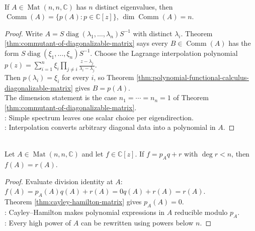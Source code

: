 \begin{corollary} \label{cor:commutant-distinct-eigenvalues-polynomials} \\
If $A\in\operatorname{Mat}(n,n,\mathbb{C})$ has $n$ distinct eigenvalues, then $\operatorname{Comm}(A)=\{p(A):p\in\mathbb{C}[z]\}$, $\dim\operatorname{Comm}(A)=n$.
\begin{proof}
Write $A=S\operatorname{diag}(\lambda_1,\ldots,\lambda_n)S^{-1}$ with distinct $\lambda_i$. Theorem \ref{thm:commutant-of-diagonalizable-matrix} says every $B\in\operatorname{Comm}(A)$ has the form $S\operatorname{diag}(\xi_1,\ldots,\xi_n)S^{-1}$. Choose the Lagrange interpolation polynomial $p(z)=\sum\limits_{i=1}^{n}\xi_i\prod\limits_{j\neq i}\frac{z-\lambda_j}{\lambda_i-\lambda_j}$.\\
Then $p(\lambda_i)=\xi_i$ for every $i$, so Theorem \ref{thm:polynomial-functional-calculus-diagonalizable-matrix} gives $B=p(A)$.\\
The dimension statement is the case $n_1=\cdots=n_n=1$ of Theorem \ref{thm:commutant-of-diagonalizable-matrix}.\\
: Simple spectrum leaves one scalar choice per eigendirection.\\
: Interpolation converts arbitrary diagonal data into a polynomial in $A$.
\end{proof}
\end{corollary}

\begin{corollary} \label{cor:polynomial-reduction-by-characteristic-polynomial} \\
Let $A\in\operatorname{Mat}(n,n,\mathbb{C})$ and let $f\in\mathbb{C}[z]$. If $f=p_Aq+r$ with $\deg r<n$, then $f(A)=r(A)$.
\begin{proof}
Evaluate division identity at $A$: $f(A)=p_A(A)q(A)+r(A)=0q(A)+r(A)=r(A)$.\\
Theorem \ref{thm:cayley-hamilton-matrix} gives $p_A(A)=0$.\\
: Cayley--Hamilton makes polynomial expressions in $A$ reducible modulo $p_A$.\\
: Every high power of $A$ can be rewritten using powers below $n$.
\end{proof}
\end{corollary}

